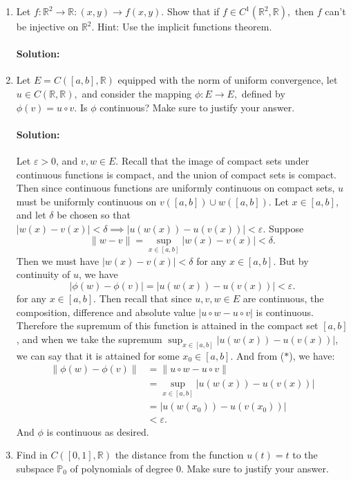 \documentclass{article}
\begin{document}
\begin{enumerate}
\item  Let $f:\mathbb{R}^2\to\mathbb{R}:(x,y)\to f(x,y).$ Show that if $f\in C^1(\mathbb{R}^2,\mathbb{R}),$ then $f$ can't be injective on $\mathbb{R}^2.$ Hint: Use the implicit functions theorem.
    \paragraph{Solution: }

\item  Let $E=C([a,b],\mathbb{R})$ equipped with the norm of uniform convergence, let $u\in C(\mathbb{R},\mathbb{R}),$ and consider the mapping $\phi:E\to E,$ defined by $\phi(v)=u\circ v.$ Is $\phi$ continuous? Make sure to justify your answer.
    \paragraph{Solution: } Let $\varepsilon>0$, and $v,w\in E$. Recall that the image of compact sets under continuous functions is compact, and the union of compact sets is compact. Then since continuous functions are uniformly continuous on compact sets, $u$ must be uniformly continuous on $v([a,b])\cup w([a,b])$. Let $x\in [a,b]$, and let $\delta$ be chosen so that $|w(x)-v(x)|<\delta\implies|u(w(x))-u(v(x))|<\varepsilon$. 
    Suppose
    \[
        \|w-v\|= \sup_{x\in [a,b]}|w(x)-v(x)| <\delta \tag{$*$}
    .\] 
    Then we must have $|w(x)-v(x)|<\delta$ for any $x\in [a,b]$. But by continuity of $u$, we have 
    \[ |\phi(w)-\phi(v)|=|u(w(x))-u(v(x))|<\varepsilon .\] 
    for any $x\in [a,b]$. Then recall that since $u,v,w\in E$ are continuous, the composition, difference and absolute value $|u\circ w-u\circ v|$ is continuous. Therefore the supremum of this function is attained in the compact set $[a,b]$, and when we take the supremum $\sup_{x\in [a,b]}|u(w(x))-u(v(x))|$, we can say that it is attained for some $x_0\in [a,b]$. And from ($*$), we have:
    \begin{align*}
        \|\phi(w)-\phi(v)\|&=\|u\circ w-u\circ v\|\\
                           &=\sup_{x\in [a,b]}|u(w(x))-u(v(x))|\\
                           &=|u(w(x_0))-u(v(x_0))|\\
                           &<\varepsilon
    .\end{align*}
    And $\phi$ is continuous as desired.

\item  Find in $C([0,1],\mathbb{R})$ the distance from the function $u(t)=t$ to the subspace $\mathbb{P}_0$ of polynomials of degree $0.$ Make sure to justify your answer.

\end{enumerate}
\end{document}
